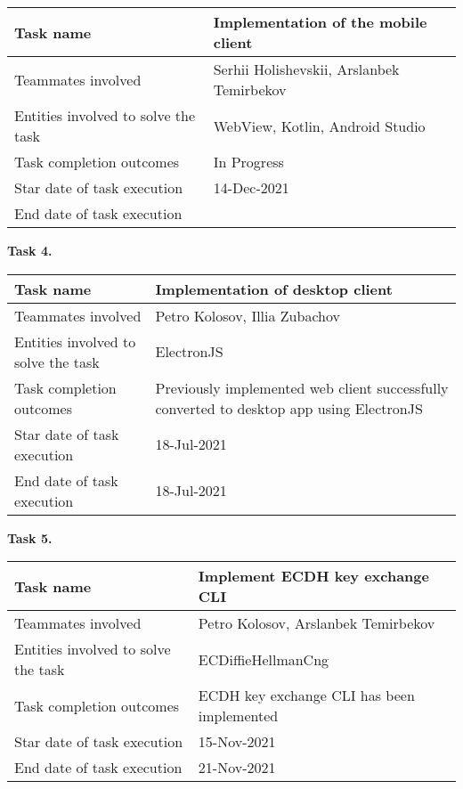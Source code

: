 \begin{tabular}{|p{}|p{}|}
    \hline
    Task name                           & Implementation of the mobile client       \\
    \hline
    Teammates involved                  & Serhii Holishevskii, Arslanbek Temirbekov \\
    \hline
    Entities involved to solve the task & WebView, Kotlin, Android Studio           \\
    \hline
    Task completion outcomes            & In Progress                               \\
    \hline
    Star date of task execution         & 14-Dec-2021                               \\
    \hline
    End date of task execution          &                                           \\
    \hline
\end{tabular}
\vskip 5mm
\hspace*{-6mm}\textbf{Task 4.}\\[2mm]
\begin{tabular}{|p{}|p{}|}
    \hline
    Task name                           & Implementation of desktop client \\
    \hline
    Teammates involved                  & Petro Kolosov, Illia Zubachov    \\
    \hline
    Entities involved to solve the task & ElectronJS                       \\
    \hline
    Task completion outcomes & Previously implemented web client successfully converted to
    desktop app using ElectronJS \\
    \hline
    Star date of task execution         & 18-Jul-2021                      \\
    \hline
    End date of task execution          & 18-Jul-2021                      \\
    \hline
\end{tabular}
\vskip 5mm
\hspace*{-6mm}\textbf{Task 5.}\\[2mm]
\begin{tabular}{|p{}|p{}|}
    \hline
    Task name                           & Implement ECDH key exchange CLI            \\
    \hline
    Teammates involved                  & Petro Kolosov, Arslanbek Temirbekov        \\
    \hline
    Entities involved to solve the task & ECDiffieHellmanCng                         \\
    \hline
    Task completion outcomes            & ECDH key exchange CLI has been implemented \\
    \hline
    Star date of task execution         & 15-Nov-2021                                \\
    \hline
    End date of task execution          & 21-Nov-2021                                \\
    \hline
\end{tabular}